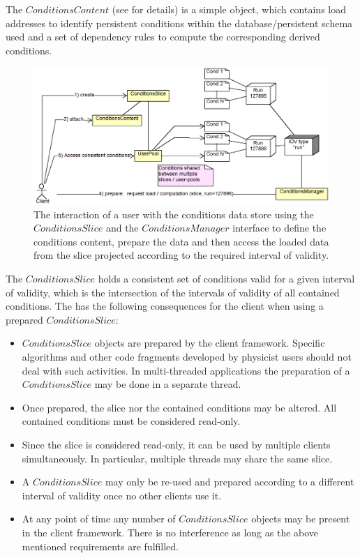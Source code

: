 \documentclass[10pt,a4paper]{article}
\begin{document}
\noindent
The $ConditionsContent$ 
(see  
for details)  is a simple object, which contains load addresses
to identify persistent conditions within the database/persistent schema 
used and a set of dependency rules to compute the corresponding derived conditions.

\begin{figure}[t]
  \begin{center}\includegraphics[width=15cm] {DDCond-ConditionsAccess.png}
    \caption{The interaction of a user with the conditions
             data store using the $ConditionsSlice$ and the 
             $ConditionsManager$ interface to define the conditions content, 
             prepare the data and then access the loaded data from the slice
             projected according to the required interval of validity.}
    \label{fig:ddcond-slice-usage}
  \end{center}
\end{figure}

\noindent
The $ConditionsSlice$ holds a consistent set of conditions valid for a given 
interval of validity, which is the intersection of the intervals of 
validity of all contained conditions. The has the following consequences 
for the client when using a prepared $ConditionsSlice$:
\begin{itemize}
\item $ConditionsSlice$ objects are prepared by the client framework.
      Specific algorithms and other code fragments developed by physicist users
      should not deal with such activities. In multi-threaded applications
      the preparation of a $ConditionsSlice$ may be done in a separate thread.
\item Once prepared, the slice nor the contained conditions may be altered.
      All contained conditions must be considered read-only.
\item Since the slice is considered read-only, it can be used by multiple 
      clients simultaneously. In particular, multiple threads may share 
      the same slice.
\item A $ConditionsSlice$ may only be re-used and prepared according to
      a different interval of validity once no other clients use it.
\item At any point of time any number of $ConditionsSlice$ objects
      may be present in the client framework. There is no interference
      as long as the above mentioned requirements are fulfilled.
\end{itemize}
\end{document}
